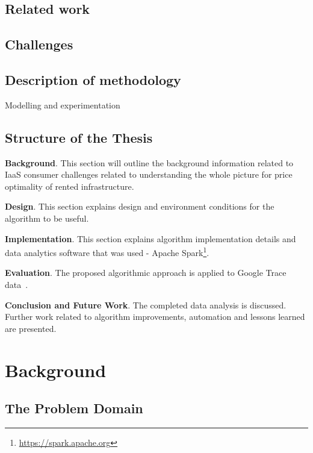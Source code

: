 \documentclass[]{final_report}
\begin{document}
\section{Related work}




\section{Challenges}

\section{Description of methodology}
Modelling and experimentation

\section{Structure of the Thesis}
\textbf{Background}. This section will outline the background information related to IaaS consumer challenges related to understanding the whole picture for price optimality of rented infrastructure. \par
\textbf{Design}. This section explains design and environment conditions for the algorithm to be useful. \par
\textbf{Implementation}. This section explains algorithm implementation details and data analytics software that was used - Apache Spark\footnote{\url{https://spark.apache.org}}. \par
\textbf{Evaluation}. The proposed algorithmic approach is applied to Google Trace data~\cite{clusterdata:Reiss2011}. \par
\textbf{Conclusion and Future Work}. The completed data analysis is discussed. Further work related to algorithm improvements, automation and lessons learned are presented. 
 
\newpage


\chapter{Background}

\section{The Problem Domain} 
\end{document}
